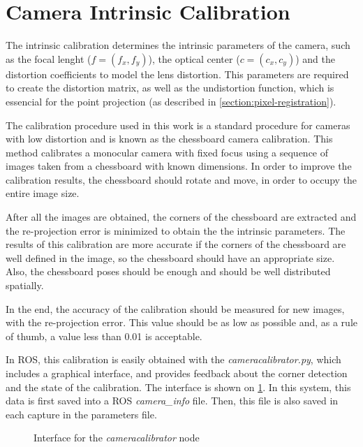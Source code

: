 \section{Camera Intrinsic Calibration}
\label{section:camera-intrinsic-calibration}

The intrinsic calibration determines the intrinsic parameters of the camera, such as the focal lenght ($f = (f_x, f_y)$), the optical center ($c = (c_x, c_y)$) and the distortion coefficients to model the lens distortion. This parameters are required to create the distortion matrix, as well as the undistortion function, which is essencial for the point projection (as described in \cref{section:pixel-registration}).

The calibration procedure used in this work is a standard procedure for cameras with low distortion and is known as the chessboard camera calibration. This method calibrates a monocular camera with fixed focus using a sequence of images taken from a chessboard with known dimensions. In order to improve the calibration results, the chessboard should rotate and move, in order to occupy the entire image size.

After all the images are obtained, the corners of the chessboard are extracted and the re-projection error is minimized to obtain the the intrinsic parameters. The results of this calibration are more accurate if the corners of the chessboard are well defined in the image, so the chessboard should have an appropriate size. Also, the chessboard poses should be enough and should be well distributed spatially.

In the end, the accuracy of the calibration should be measured for new images, with the re-projection error. This value should be as low as possible and, as a rule of thumb, a value less than \num{0.01} is acceptable.

In ROS, this calibration is easily obtained with the \emph{cameracalibrator.py}, which includes a graphical interface, and provides feedback about the corner detection and the state of the calibration. The interface is shown on \cref{figure:camera-calibrator}. In this system, this data is first saved into a ROS \emph{camera\_info} file. Then, this file is also saved in each capture in the parameters file.

\begin{figure}
    
    \caption{Interface for the \emph{cameracalibrator} node}
    \label{figure:camera-calibrator}

\end{figure}